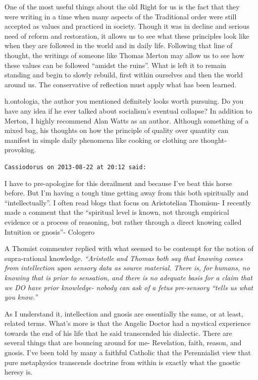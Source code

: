 \begin{footnotesize}
\begin{sffamily}
One of the most useful things about the old Right for us is the fact that they were writing in a time when many aspects of the Traditional order were still accepted as values and practiced in society. Though it was in decline and serious need of reform and restoration, it allows us to see what these principles look like when they are followed in the world and in daily life. Following that line of thought, the writings of someone like Thomas Merton may allow us to see how these values can be followed ``amidst the ruins''. What is left it to remain standing and begin to slowly rebuild, first within ourselves and then the world around us. The conservative of reflection must apply what has been learned.

h.ontologia, the author you mentioned definitely looks worth pursuing. Do you have any idea if he ever talked about socialism's eventual collapse? In addition to Merton, I highly recommend Alan Watts as an author. Although something of a mixed bag, his thoughts on how the principle of quality over quantity can manifest in simple daily phenomena like cooking or clothing are thought-provoking.

\hfill

\texttt{Cassiodorus on 2013-08-22 at 20:12 said:}

I have to pre-apologize for this derailment and because I've beat this horse before. But I'm having a tough time getting away from this both spiritually and ``intellectually''. I often read blogs that focus on Aristotelian Thomism- I recently made a comment that the ``spiritual level is known, not through empirical evidence or a process of reasoning, but rather through a direct knowing called Intuition or gnosis''- Cologero

A Thomist commenter replied with what seemed to be contempt for the notion of supra-rational knowledge. \emph{``Aristotle and Thomas both say that knowing comes from intellection upon sensory data as source material. There is, for humans, no knowing that is prior to sensation, and there is no adequate basis for a claim that we DO have prior knowledge- nobody can ask of a fetus pre-sensory ``tells us what you know.''}

As I understand it, intellection and gnosis are essentially the same, or at least, related terms. What's more is that the Angelic Doctor had a mystical experience towards the end of his life that he said transcended his dialectic. There are several things that are bouncing around for me- Revelation, faith, reason, and gnosis. I've been told by many a faithful Catholic that the Perennialist view that pure metaphysics transcends doctrine from within is exactly what the gnostic heresy is.


\end{sffamily}
\end{footnotesize}
